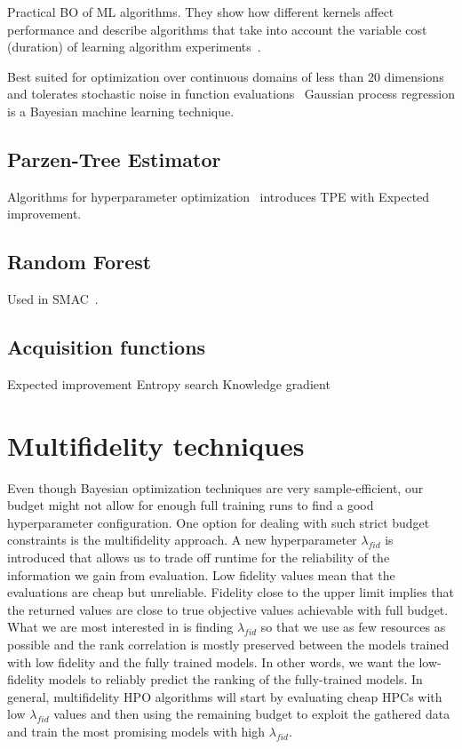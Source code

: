 Practical BO of ML algorithms. They show how different kernels affect performance and describe algorithms that take into account the variable cost (duration) of learning algorithm experiments~\cite{snoek2012practical}.

Best suited for optimization over continuous domains of less than 20 dimensions and tolerates stochastic noise in function evaluations~\cite{frazier2018tutorial} Gaussian process regression is a Bayesian machine learning technique.


\subsection{Parzen-Tree Estimator}

Algorithms for hyperparameter optimization~\cite{bergstra2011algorithms} introduces TPE with Expected improvement.

\subsection{Random Forest}

Used in SMAC~\cite{hutter2010sequential}\cite{hutter2011sequential}.

\subsection{Acquisition functions}
Expected improvement
Entropy search
Knowledge gradient

\section{Multifidelity techniques}
Even though Bayesian optimization techniques are very sample-efficient, our budget might not allow for enough full training runs to find a good hyperparameter configuration. One option for dealing with such strict budget constraints is the multifidelity approach. A new hyperparameter $\lambda_{fid}$ is introduced that allows us to trade off runtime for the reliability of the information we gain from evaluation. Low fidelity values mean that the evaluations are cheap but unreliable. Fidelity close to the upper limit implies that the returned values are close to true objective values achievable with full budget. What we are most interested in is finding $\lambda_{fid}$ so that we use as few resources as possible and the rank correlation is mostly preserved between the models trained with low fidelity and the fully trained models. In other words, we want the low-fidelity models to reliably predict the ranking of the fully-trained models. In general, multifidelity HPO algorithms will start by evaluating cheap HPCs with low $\lambda_{fid}$ values and then using the remaining budget to exploit the gathered data and train the most promising models with high $\lambda_{fid}$.


